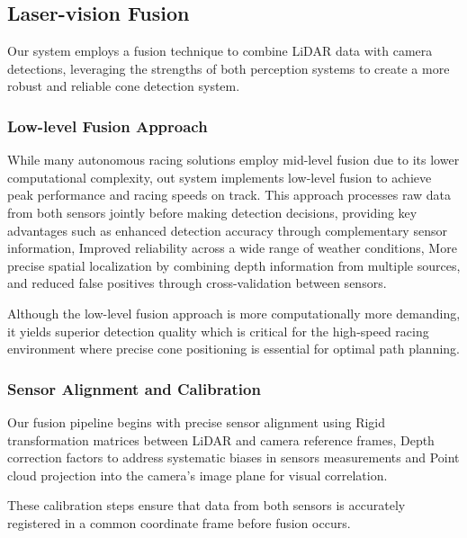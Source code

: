\documentclass[conference]{IEEEtran}
\begin{document}
\subsection{Laser-vision Fusion}\vspace{-0.4em}
Our system employs a fusion technique to combine LiDAR data with camera detections, leveraging the strengths of both perception systems to create a more robust and reliable cone detection system.

\subsubsection{Low-level Fusion Approach}
While many autonomous racing solutions employ mid-level fusion due to its lower computational complexity, out system implements low-level fusion to achieve peak performance and racing speeds on track. This approach processes raw data from both sensors jointly before making detection decisions, providing key advantages such as enhanced detection accuracy through complementary sensor information, Improved reliability across a wide range of weather conditions, More precise spatial localization by combining depth information from multiple sources, and reduced false positives through cross-validation between sensors.

Although the low-level fusion approach is more computationally more demanding, it yields superior detection quality which is critical for the high-speed racing environment where precise cone positioning is essential for optimal path planning.

\subsubsection{Sensor Alignment and Calibration}
Our fusion pipeline begins with precise sensor alignment using Rigid transformation matrices between LiDAR and camera reference frames, Depth correction factors to address systematic biases in sensors measurements and Point cloud projection into the camera's image plane for visual correlation.

These calibration steps ensure that data from both sensors is accurately registered in a common coordinate frame before fusion occurs.
\end{document}
